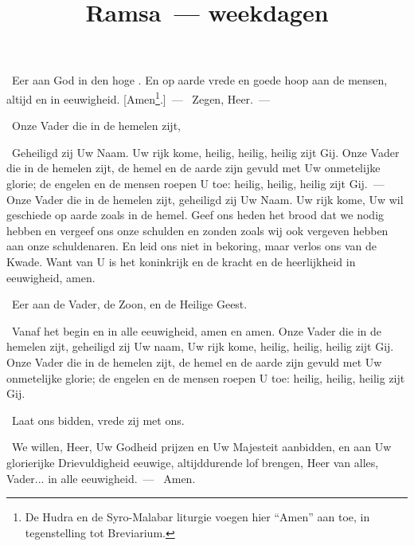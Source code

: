 \documentclass[12pt,twoside,a5paper]{article}
\begin{document}
\title{Ramsa~--- weekdagen}
\author{}
\date{}
\maketitle


\begin{halfparskip}
  \cc~Eer aan God in den hoge . En op aarde vrede en goede hoop aan de mensen, altijd en in eeuwigheid. [Amen\footnote{De Hudra en de Syro-Malabar liturgie voegen hier ``Amen'' aan toe, in tegenstelling tot Breviarium.}.]~--- \rr~Zegen, Heer.~--- 

  \cc~Onze Vader die in de hemelen zijt,

  \rr~Geheiligd zij Uw Naam. Uw rijk kome, heilig, heilig, heilig zijt Gij. Onze Vader die in de hemelen zijt, de hemel en de aarde zijn gevuld met Uw onmetelijke glorie; de engelen en de mensen roepen U toe: heilig, heilig, heilig zijt Gij.~--- Onze Vader die in de hemelen zijt, geheiligd zij Uw Naam. Uw rijk kome, Uw wil geschiede op aarde zoals in de hemel. Geef ons heden het brood dat we nodig hebben en vergeef ons onze schulden en zonden zoals wij ook vergeven hebben aan onze schuldenaren. En leid ons niet in bekoring, maar verlos ons van de Kwade. Want van U is het koninkrijk en de kracht en de heerlijkheid in eeuwigheid, amen.

  \cc~Eer aan de Vader, de Zoon, en de Heilige Geest.

  \rr~Vanaf het begin en in alle eeuwigheid, amen en amen. Onze Vader die in de hemelen zijt, geheiligd zij Uw naam, Uw rijk kome, heilig, heilig, heilig zijt Gij. Onze Vader die in de hemelen zijt, de hemel en de aarde zijn gevuld met Uw onmetelijke glorie; de engelen en de mensen roepen U toe: heilig, heilig, heilig zijt Gij.

  \dd~Laat ons bidden, vrede zij met ons.

  \cc~We willen, Heer, Uw Godheid prijzen  en Uw Majesteit aanbidden, en aan Uw glorierijke Drievuldigheid eeuwige, altijddurende lof brengen, Heer van alles, Vader... in alle eeuwigheid.~--- \rr~Amen.
\end{halfparskip}


\end{document}

